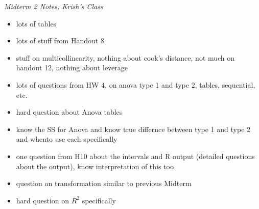 \documentclass[8pt]{extarticle}
\begin{document}
\textit{Midterm 2 Notes: Krish's Class}
\begin{itemize}
    \item lots of tables
    \item lots of stuff from Handout 8
    \item stuff on multicollinearity, nothing about cook's distance, not much on
    handout 12, nothing about leverage
    \item lots of questions from HW 4, on anova type 1 and type 2, tables, 
    sequential, etc.
    \item hard question about Anova tables
    \item know the SS for Anova and know true differnce between type 1 and type 
    2 and whento use each specifically
    \item one question from H10 about the intervals and R output (detailed 
    questions about the output), know interpretation of this too
    \item question on transformation similar to previous Midterm
    \item hard question on $R^2$ specifically
\end{itemize}

\end{document}
